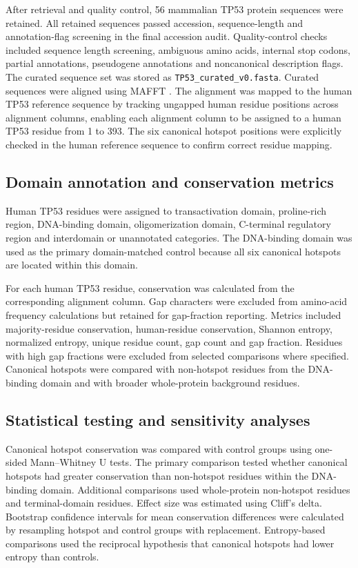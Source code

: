 \documentclass[namedate,webpdf,contemporary,large]{oup-authoring-template}
\begin{document}
After retrieval and quality control, 56 mammalian TP53 protein sequences were retained. All retained sequences passed accession, sequence-length and annotation-flag screening in the final accession audit. Quality-control checks included sequence length screening, ambiguous amino acids, internal stop codons, partial annotations, pseudogene annotations and noncanonical description flags. The curated sequence set was stored as \texttt{TP53\_curated\_v0.fasta}. Curated sequences were aligned using MAFFT \citep{katoh2013}. The alignment was mapped to the human TP53 reference sequence by tracking ungapped human residue positions across alignment columns, enabling each alignment column to be assigned to a human TP53 residue from 1 to 393. The six canonical hotspot positions were explicitly checked in the human reference sequence to confirm correct residue mapping.

\subsection{Domain annotation and conservation metrics}
Human TP53 residues were assigned to transactivation domain, proline-rich region, DNA-binding domain, oligomerization domain, C-terminal regulatory region and interdomain or unannotated categories. The DNA-binding domain was used as the primary domain-matched control because all six canonical hotspots are located within this domain.

For each human TP53 residue, conservation was calculated from the corresponding alignment column. Gap characters were excluded from amino-acid frequency calculations but retained for gap-fraction reporting. Metrics included majority-residue conservation, human-residue conservation, Shannon entropy, normalized entropy, unique residue count, gap count and gap fraction. Residues with high gap fractions were excluded from selected comparisons where specified. Canonical hotspots were compared with non-hotspot residues from the DNA-binding domain and with broader whole-protein background residues.

\subsection{Statistical testing and sensitivity analyses}
Canonical hotspot conservation was compared with control groups using one-sided Mann--Whitney U tests. The primary comparison tested whether canonical hotspots had greater conservation than non-hotspot residues within the DNA-binding domain. Additional comparisons used whole-protein non-hotspot residues and terminal-domain residues. Effect size was estimated using Cliff's delta. Bootstrap confidence intervals for mean conservation differences were calculated by resampling hotspot and control groups with replacement. Entropy-based comparisons used the reciprocal hypothesis that canonical hotspots had lower entropy than controls.
\end{document}
